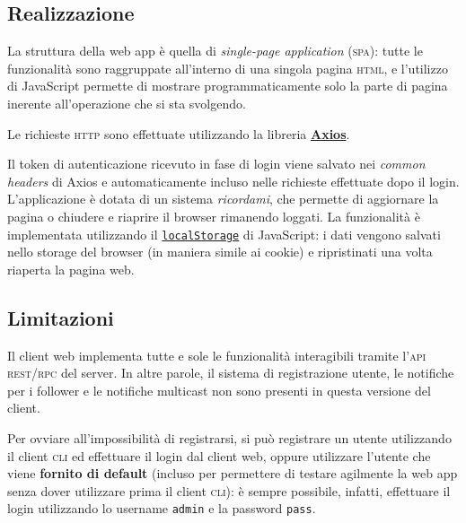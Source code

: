 \documentclass[a4paper,8pt]{article} %
\def\code#1{\texttt{#1}}
\begin{document}
\subsection{Realizzazione}
La struttura della web app è quella di \emph{single-page application} (\textsc{spa}): tutte le funzionalità sono raggruppate all'interno di una singola pagina \textsc{html}, e l'utilizzo di JavaScript permette di mostrare programmaticamente
solo la parte di pagina inerente all'operazione che si sta svolgendo.
\par Le richieste \textsc{http} sono effettuate utilizzando la libreria \href{https://axios-http.com/docs/intro}{\textbf{Axios}}.
\par Il token di autenticazione ricevuto in fase di login viene salvato nei \emph{common headers} di Axios e automaticamente incluso nelle richieste effettuate dopo il login.
L'applicazione è dotata di un sistema \emph{ricordami}, che permette di aggiornare la pagina o chiudere e riaprire il browser rimanendo loggati. La funzionalità è implementata utilizzando
il \href{https://developer.mozilla.org/en-US/docs/Web/API/Window/localStorage?retiredLocale=it}{\code{localStorage}} di JavaScript: i dati vengono salvati nello storage del browser (in maniera simile ai cookie) e ripristinati
una volta riaperta la pagina web.

\subsection{Limitazioni}
Il client web implementa tutte e sole le funzionalità interagibili tramite l'\textsc{api} \textsc{rest}/\textsc{rpc} del server.
In altre parole, il sistema di registrazione utente, le notifiche per i follower e le notifiche multicast non sono presenti in questa versione del client.
\par Per ovviare all'impossibilità di registrarsi, si può registrare un utente utilizzando il client \textsc{cli} ed effettuare il login dal client web, oppure utilizzare l'utente
che viene \textbf{fornito di default} (incluso per permettere di testare agilmente la web app senza dover utilizzare prima il client \textsc{cli}): è sempre possibile, infatti, effettuare il login utilizzando lo username \code{admin} e la password \code{pass}.
\end{document}
